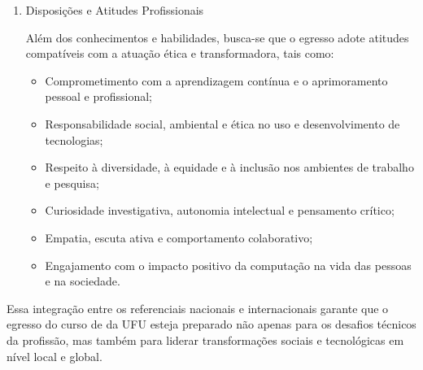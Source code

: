 \begin{enumerate}[label=\Roman*.]
\begin{itemize}
    \item Raciocínio lógico, computacional e analítico para resolver problemas complexos;
    \item Capacidade de abstração, modelagem e decomposição de sistemas;
    \item Comunicação eficaz com públicos técnicos e não técnicos, em diferentes meios e idiomas;
    \item Capacidade de colaboração em equipes interdisciplinares e multiculturais;
    \item Adaptabilidade a novos contextos tecnológicos e metodológicos;
    \item Organização e gestão do tempo e do próprio aprendizado;
    \item Liderança técnica em projetos, com tomada de decisão embasada e eficaz;
    \item Capacidade de avaliação crítica de sistemas computacionais e inovação tecnológica.
\end{itemize}

\item Disposições e Atitudes Profissionais~\cite{ACM:CC2020}

Além dos conhecimentos e habilidades, busca-se que o egresso adote atitudes compatíveis com a atuação ética e transformadora, tais como:

\begin{itemize}
    \item Comprometimento com a aprendizagem contínua e o aprimoramento pessoal e profissional;
    \item Responsabilidade social, ambiental e ética no uso e desenvolvimento de tecnologias;
    \item Respeito à diversidade, à equidade e à inclusão nos ambientes de trabalho e pesquisa;
    \item Curiosidade investigativa, autonomia intelectual e pensamento crítico;
    \item Empatia, escuta ativa e comportamento colaborativo;
    \item Engajamento com o impacto positivo da computação na vida das pessoas e na sociedade.
\end{itemize}
\end{enumerate}

Essa integração entre os referenciais nacionais e internacionais garante que o egresso do curso de \ppccurso da UFU esteja preparado não apenas para os desafios técnicos da profissão, mas também para liderar transformações sociais e tecnológicas em nível local e global.

